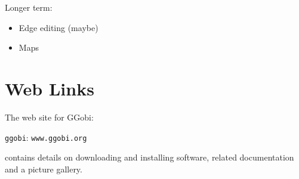 \documentclass[11pt]{article}
\begin{document}
Longer term:

\begin{itemize}
\item Edge editing (maybe)
\item Maps
\end{itemize}

\section*{Web Links}

The web site for GGobi:

\centerline{{\tt ggobi}: {\tt www.ggobi.org}}

contains details on downloading and installing software, related
documentation and a picture gallery.

\newpage

\end{document}
